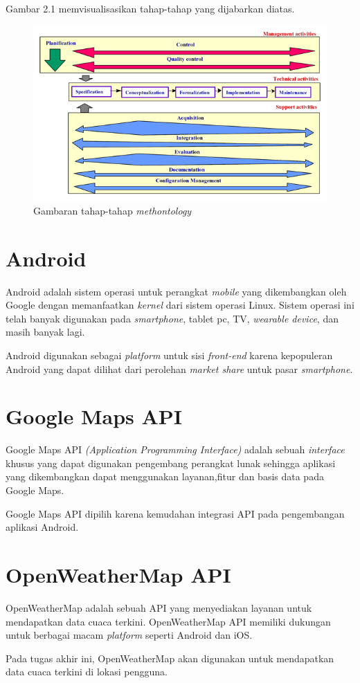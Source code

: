 \par
Gambar 2.1 memvisualisasikan tahap-tahap yang dijabarkan diatas.
\begin{figure}[h!]
    \centering
    \includegraphics[scale=0.5]{img/methontology_cycle.png}
    \caption{Gambaran tahap-tahap \textit{methontology}}
    \label{fig:Gambar}
\end{figure}

\section{Android}
Android adalah sistem operasi untuk perangkat \textit{mobile} yang dikembangkan oleh Google dengan memanfaatkan \textit{kernel} dari sistem operasi Linux. Sistem operasi ini telah banyak digunakan pada \textit{smartphone}, tablet pc, TV, \textit{wearable device}, dan masih banyak lagi.

Android digunakan sebagai \textit{platform} untuk sisi \textit{front-end} karena kepopuleran Android yang dapat dilihat dari perolehan \textit{market share} untuk pasar \textit{smartphone}\cite{androidmarket}.

\section{Google Maps API}
Google Maps API \textit{(Application Programming Interface)} adalah sebuah \textit{interface} khusus yang dapat digunakan pengembang perangkat lunak sehingga aplikasi yang dikembangkan dapat menggunakan layanan,fitur dan basis data pada Google Maps.
\par
Google Maps API dipilih karena kemudahan integrasi API pada pengembangan aplikasi Android.  

\section{OpenWeatherMap API}
OpenWeatherMap adalah sebuah API yang menyediakan layanan untuk mendapatkan data cuaca terkini. OpenWeatherMap API memiliki dukungan untuk berbagai macam \textit{platform} seperti Android dan iOS.
\par
Pada tugas akhir ini, OpenWeatherMap akan digunakan untuk mendapatkan data cuaca terkini di lokasi pengguna.

